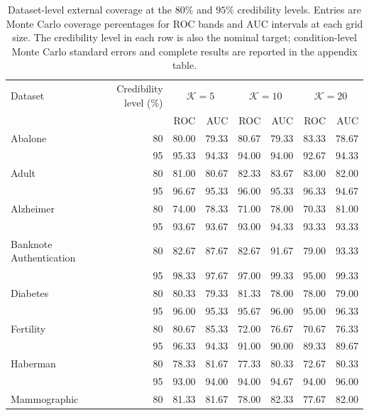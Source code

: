 \begin{table}[t]
\centering
\caption{Dataset-level external coverage at the $80\%$ and $95\%$ credibility levels. Entries are Monte Carlo coverage percentages for ROC bands and AUC intervals at each grid size. The credibility level in each row is also the nominal target; condition-level Monte Carlo standard errors and complete results are reported in the appendix table.}
\label{tab:empirical-evaluation-on-real-world-datasets-dataset-coverage}
\begingroup
\small
\setlength{\tabcolsep}{4pt}
\renewcommand{\arraystretch}{1.05}
\begin{tabular}{@{}lrrrrrrr@{}}
\hline
Dataset & \shortstack{Credibility\\level ($\%$)} & \multicolumn{2}{c}{$\mathcal K=5$} & \multicolumn{2}{c}{$\mathcal K=10$} & \multicolumn{2}{c}{$\mathcal K=20$} \\
 & & ROC & AUC & ROC & AUC & ROC & AUC \\
\hline
Abalone & 80 & 80.00 & 79.33 & 80.67 & 79.33 & 83.33 & 78.67 \\
 & 95 & 95.33 & 94.33 & 94.00 & 94.00 & 92.67 & 94.33 \\[1pt]
Adult & 80 & 81.00 & 80.67 & 82.33 & 83.67 & 83.00 & 82.00 \\
 & 95 & 96.67 & 95.33 & 96.00 & 95.33 & 96.33 & 94.67 \\[1pt]
Alzheimer & 80 & 74.00 & 78.33 & 71.00 & 78.00 & 70.33 & 81.00 \\
 & 95 & 93.67 & 93.67 & 93.00 & 94.33 & 93.33 & 93.33 \\[1pt]
Banknote Authentication & 80 & 82.67 & 87.67 & 82.67 & 91.67 & 79.00 & 93.33 \\
 & 95 & 98.33 & 97.67 & 97.00 & 99.33 & 95.00 & 99.33 \\[1pt]
Diabetes & 80 & 80.33 & 79.33 & 81.33 & 78.00 & 78.00 & 79.00 \\
 & 95 & 96.00 & 95.33 & 95.67 & 96.00 & 95.00 & 96.33 \\[1pt]
Fertility & 80 & 80.67 & 85.33 & 72.00 & 76.67 & 70.67 & 76.33 \\
 & 95 & 96.33 & 94.33 & 91.00 & 90.00 & 89.33 & 89.67 \\[1pt]
Haberman & 80 & 78.33 & 81.67 & 77.33 & 80.33 & 72.67 & 80.33 \\
 & 95 & 93.00 & 94.00 & 94.00 & 94.67 & 94.00 & 96.00 \\[1pt]
Mammographic & 80 & 81.33 & 81.67 & 78.00 & 82.33 & 77.67 & 82.00 \\

\end{tabular}
\end{table}
